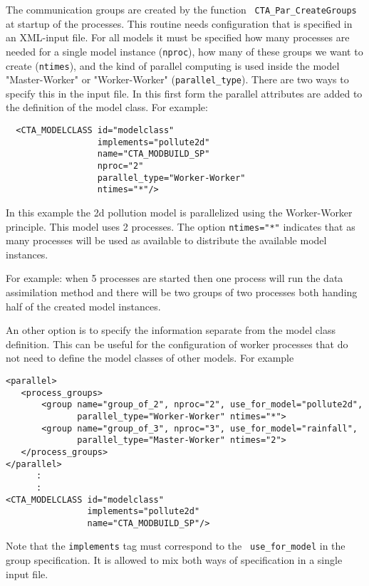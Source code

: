 \documentclass[a4paper,12pt]{article}
\begin{document}
The communication groups are created by the function {\tt
CTA\_Par\_CreateGroups} at startup of the processes. This routine needs
configuration that is specified in an XML-input file. For all models it
must be specified how many processes are needed for a single model instance
({\tt nproc}), how many of these groups we want to create ({\tt ntimes}), and
the kind of parallel computing is used inside the model "Master-Worker" or
"Worker-Worker" ({\tt parallel\_type}). There are two ways to specify this in
the input file. In this first form the parallel attributes are added to the
definition of the model class. For example:
\begin{verbatim}
  <CTA_MODELCLASS id="modelclass"
                  implements="pollute2d"
                  name="CTA_MODBUILD_SP"
                  nproc="2" 
                  parallel_type="Worker-Worker"
                  ntimes="*"/>
\end{verbatim}
In this example the 2d pollution model is parallelized using the
Worker-Worker principle. This model uses 2 processes. The
option {\tt ntimes="*"} indicates that as many processes will be used as
available to distribute the available model instances.

For example: when 5 processes are started then one process will run the
data assimilation method and there will be two groups of two processes both
handing half of the created model instances.

An other option is to specify the information separate from the model class
definition. This can be useful for the configuration of worker processes
that do not need to define the model classes of other models. For example
\begin{verbatim}
<parallel>
   <process_groups>
       <group name="group_of_2", nproc="2", use_for_model="pollute2d",
              parallel_type="Worker-Worker" ntimes="*">
       <group name="group_of_3", nproc="3", use_for_model="rainfall",
              parallel_type="Master-Worker" ntimes="2">
   </process_groups>
</parallel>
      :
      :
<CTA_MODELCLASS id="modelclass"
                implements="pollute2d"
                name="CTA_MODBUILD_SP"/>

\end{verbatim}
Note that the {\tt implements} tag must correspond to the {\tt
use\_for\_model} in the group specification. It is allowed to mix both ways
of specification in a single input file. 
\end{document}
